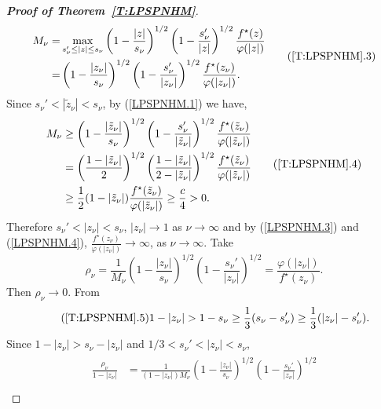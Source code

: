 \documentclass[11pt, reqno]{amsart}
\theoremstyle{definition}
\theoremstyle{remark}
\numberwithin{equation}{section}
\begin{document}
\begin{proof}[{\bf Proof of Theorem~\ref{T:LPSPNHM}}]
\begin{align*}
\begin{split}
M_{\nu} = &\max_{s_{\nu}'\leq|z|\leq s_{\nu}}\left(1-\frac{|z|}{s_{\nu}}\right)^{1/2}\left(1-\frac{s_{\nu}'}{|z|}\right)^{1/2}\frac{f^\star(z)}{\varphi(|z|)}\\
= & \left(1-\frac{|z_{\nu}|}{s_{\nu}}\right)^{1/2}\left(1-\frac{s_{\nu}'}{|z_{\nu}|}\right)^{1/2}\frac{f^\star(z_{\nu})}{\varphi(|z_{\nu}|)}.
\end{split} \label{LPSPNHM.3} \tag{\ref*{T:LPSPNHM}.3}
\end{align*}
Since $s_{\nu}' < |\tilde{z}_{\nu}| < s_{\nu}$, by (\ref{LPSPNHM.1}) we have,
\begin{align*}
\begin{split}
M_{\nu} &\geq \left(1-\frac{|\tilde{z}_{\nu}|}{s_{\nu}}\right)^{1/2} \left(1-\frac{s_{\nu}'}{|\tilde{z}_{\nu}|}\right)^{1/2} \frac{f^\star(\tilde{z}_{\nu})}{\varphi(|\tilde{z}_{\nu}|)} \\
&= \left(\frac{1-|\tilde{z}_{\nu}|}{2}\right)^{1/2} \left(\frac{1-|\tilde{z}_{\nu}|}{2-|\tilde{z}_{\nu}|}\right)^{1/2}  \frac{f^\star(\tilde{z}_{\nu})}{\varphi(|\tilde{z}_{\nu}|)} \\
&\geq \frac{1}{2}(1-|\tilde{z}_{\nu}|) \frac{f^\star(\tilde{z}_{\nu})}{\varphi(|\tilde{z}_{\nu}|)} \geq \frac{c}{4}>0.
\end{split}\label{LPSPNHM.4} \tag{\ref*{T:LPSPNHM}.4}
\end{align*}
Therefore $s_{\nu}'<|z_{\nu}|<s_{\nu}$, $|z_{\nu}|\to 1$ as $\nu\to\infty$ and by (\ref{LPSPNHM.3}) and (\ref{LPSPNHM.4}), $\displaystyle\frac{f^\star(z_{\nu})}{\varphi(|z_{\nu}|)}\to \infty$, as $\nu\to\infty$. Take
\begin{equation*}
\rho_{\nu} =\frac{1}{M_{\nu}}\left(1-\frac{|z_{\nu}|}{s_{\nu}}\right)^{1/2}\left(1-\frac{s_{\nu}'}{|z_{\nu}|}\right)^{1/2}=\frac{\varphi(|z_{\nu}|)}{f^\star(z_{\nu})}.
\end{equation*}
Then $\rho_{\nu}  \to 0$. From
\begin{equation*} \label{LPSPNHM.5} \tag{\ref*{T:LPSPNHM}.5}
1-|z_{\nu}|>1-s_{\nu}\geq\frac{1}{3}(s_{\nu}-s_{\nu}^\prime) \geq \frac{1}{3}(|z_{\nu}|-s_{\nu}^\prime).
\end{equation*}
Since $1-|z_{\nu}|>s_{\nu}-|z_{\nu}|$ and $1/3<s_{\nu}'<|z_{\nu}|<s_{\nu}$,
\begin{align*}
\begin{split}
\frac{\rho_{\nu} }{1 - |z_{\nu}|} &= \frac{1}{(1 - |z_{\nu}|)M_{\nu}} \left(1-\frac{|z_{\nu}|}{s_{\nu}}\right)^{1/2} \left(1-\frac{s_{\nu}'}{|z_{\nu}|}\right)^{1/2} \\

\end{split}
\end{align*}
\end{proof}
\end{document}
